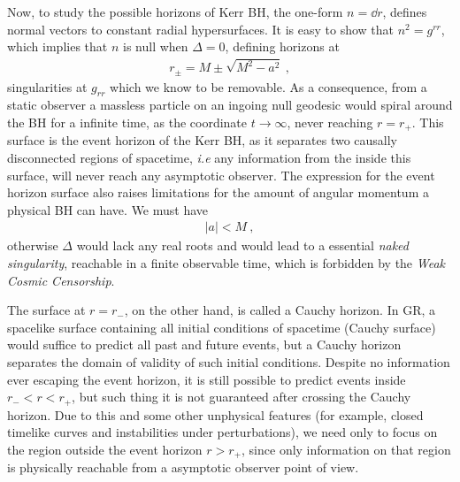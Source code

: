 Now, to study the possible horizons of Kerr BH, the one-form $n = \dd r$, defines normal vectors to constant radial hypersurfaces.
It is easy to show that $n^2 = g^{rr}$, which implies that $n$ is null when $\Delta=0$, defining horizons at 
\begin{align}
    r_\pm = M \pm \sqrt{M^2 - a^2} ~,
    \label{eq2:KerrRadius}
\end{align}
singularities at $g_{rr}$ which we know to be removable.
As a consequence, from a static observer a massless particle on an ingoing null geodesic would spiral around the BH for a infinite time, as the coordinate $t\to\infty$, never reaching $r=r_{+}$.
This surface is the event horizon of the Kerr BH, as it separates two causally disconnected regions of spacetime, \emph{i.e} any information from the inside this surface, will never reach any asymptotic observer. 
The expression for the event horizon surface also raises limitations for the amount of angular momentum a physical BH can have.
We must have 
\begin{align}
    |a| < M ~,
    \label{eq2:spinLimit}
\end{align}
otherwise $\Delta$ would lack any real roots and would lead to a essential \emph{naked singularity}, reachable in a finite observable time, which is forbidden by the \emph{Weak Cosmic Censorship}.  

The surface at $r=r_{-}$, on the other hand, is called a Cauchy horizon.
In GR, a spacelike surface containing all initial conditions of spacetime (Cauchy surface) would suffice to predict all past and future events, but a Cauchy horizon separates the domain of validity of such initial conditions.
Despite no information ever escaping the event horizon, it is still possible to predict events inside $r_{-} < r < r_{+}$, but such thing it is not guaranteed after crossing the Cauchy horizon.
Due to this and some other unphysical features (for example, closed timelike curves and instabilities under perturbations), we need only to focus on the region outside the event horizon $r>r_{+}$, since only information on that region is physically reachable from a asymptotic observer point of view.

